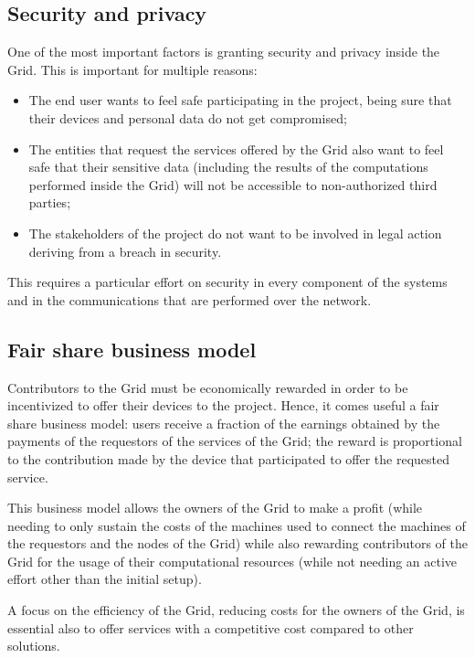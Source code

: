 \subsection{Security and privacy}
One of the most important factors is granting security and privacy inside the Grid. This is important for multiple reasons:
\begin{itemize}
    \item The end user wants to feel safe participating in the project, being sure that their devices and personal data do not get compromised;
    \item The entities that request the services offered by the Grid also want to feel safe that their sensitive data (including the results of the computations performed inside the Grid) will not be accessible to non-authorized third parties;
    \item The stakeholders of the project do not want to be involved in legal action deriving from a breach in security.
\end{itemize}

This requires a particular effort on security in every component of the systems and in the communications that are performed over the network.

\subsection{Fair share business model}
Contributors to the Grid must be economically rewarded in order to be incentivized to offer their devices to the project. Hence, it comes useful a fair share business model: users receive a fraction of the earnings obtained by the payments of the requestors of the services of the Grid; the reward is proportional to the contribution made by the device that participated to offer the requested service.

This business model allows the owners of the Grid to make a profit (while needing to only sustain the costs of the machines used to connect the machines of the requestors and the nodes of the Grid) while also rewarding contributors of the Grid for the usage of their computational resources (while not needing an active effort other than the initial setup).

A focus on the efficiency of the Grid, reducing costs for the owners of the Grid, is essential also to offer services with a competitive cost compared to other solutions.
